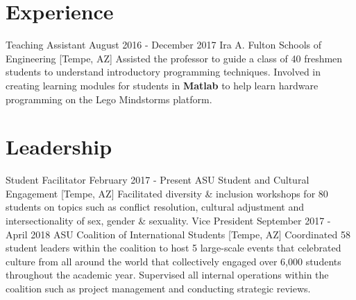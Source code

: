\section{Experience}
\sectionStart
  \jobHeading
    {Teaching Assistant}
    {August 2016 - December 2017}
    {Ira A. Fulton Schools of Engineering [Tempe, AZ]}
  \listStart
    \bulletItem
    {Assisted the professor to guide a class of 40 freshmen students to understand introductory programming techniques.}
    \bulletItem
    {Involved in creating learning modules for students in \textbf{Matlab} to help learn hardware programming on the Lego Mindstorms platform.}
  \listEnd
\sectionEnd

\section{Leadership}
\sectionStart
  \jobHeading
    {Student Facilitator}
    {February 2017 - Present}
    {ASU Student and Cultural Engagement [Tempe, AZ]}
  \listStart
    \bulletItem
    {Facilitated diversity \& inclusion workshops for 80 students on topics such as conflict resolution, cultural adjustment and intersectionality of sex, gender \& sexuality.}
  \listEnd
  \jobHeading
    {Vice President}
    {September 2017 - April 2018}
    {ASU Coalition of International Students [Tempe, AZ]}
  \listStart
    \bulletItem
    {Coordinated 58 student leaders within the coalition to host 5 large-scale events that celebrated culture from all around the world that collectively engaged over 6,000 students throughout the academic year.}
    \bulletItem
    {Supervised all internal operations within the coalition such as project management and conducting strategic reviews.}
  \listEnd
\sectionEnd


